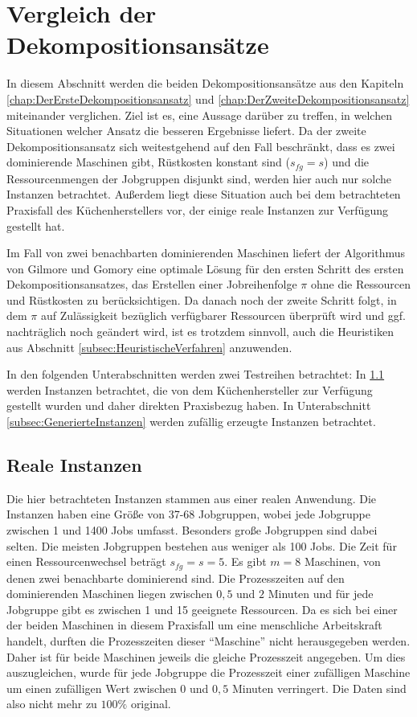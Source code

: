 \documentclass{scrreprt}
\begin{document}
\section{Vergleich der Dekompositionsansätze}
\label{sec:VergleichDerDekompositionsansaetze} 
In diesem Abschnitt werden die beiden Dekompositionsansätze aus den Kapiteln \ref{chap:DerErsteDekompositionsansatz} und \ref{chap:DerZweiteDekompositionsansatz}
miteinander verglichen. Ziel ist es, eine Aussage darüber zu treffen, in welchen Situationen welcher Ansatz die besseren Ergebnisse liefert.
Da der zweite Dekompositionsansatz sich weitestgehend auf den Fall beschränkt, dass es zwei dominierende Maschinen gibt,
Rüstkosten konstant sind ($s_{fg}=s$) und die Ressourcenmengen der Jobgruppen disjunkt sind, werden hier auch nur solche Instanzen betrachtet.
Außerdem liegt diese Situation auch bei dem betrachteten Praxisfall des Küchenherstellers vor, der einige reale Instanzen zur Verfügung gestellt hat.

Im Fall von zwei benachbarten dominierenden Maschinen liefert der Algorithmus von Gilmore und Gomory eine optimale Lösung für den ersten Schritt des ersten
Dekompositionsansatzes, das Erstellen einer Jobreihenfolge $\pi$ ohne die Ressourcen und Rüstkosten zu berücksichtigen.
Da danach noch der zweite Schritt folgt, in dem $\pi$ auf Zulässigkeit bezüglich verfügbarer Ressourcen überprüft wird
und ggf. nachträglich noch geändert wird, ist es trotzdem sinnvoll, auch die Heuristiken aus Abschnitt \ref{subsec:HeuristischeVerfahren} anzuwenden.

In den folgenden Unterabschnitten werden zwei Testreihen betrachtet: In \ref{subsec:RealeInstanzen} werden Instanzen betrachtet, 
die von dem Küchenhersteller zur Verfügung gestellt wurden und daher direkten Praxisbezug haben.
In Unterabschnitt \ref{subsec:GenerierteInstanzen} werden zufällig erzeugte Instanzen betrachtet.

\subsection{Reale Instanzen}
\label{subsec:RealeInstanzen}
Die hier betrachteten Instanzen stammen aus einer realen Anwendung.
Die Instanzen haben eine Größe von 37-68 Jobgruppen, wobei jede Jobgruppe zwischen 1 und 1400 Jobs umfasst. Besonders große Jobgruppen sind dabei selten.
Die meisten Jobgruppen bestehen aus weniger als 100 Jobs.
Die Zeit für einen Ressourcenwechsel beträgt $s_{fg}=s=5$.
Es gibt $m=8$ Maschinen, von denen zwei benachbarte dominierend sind.
Die Prozesszeiten auf den dominierenden Maschinen liegen zwischen $0{,}5$ und $2$ Minuten und für jede Jobgruppe gibt es zwischen 1 und 15 geeignete Ressourcen.
Da es sich bei einer der beiden Maschinen in diesem Praxisfall um eine menschliche Arbeitskraft handelt, 
durften die Prozesszeiten dieser "`Maschine"' nicht herausgegeben werden.
Daher ist für beide Maschinen jeweils die gleiche Prozesszeit angegeben.
Um dies auszugleichen, wurde für jede Jobgruppe die Prozesszeit einer zufälligen Maschine um einen zufälligen Wert zwischen $0$ und $0{,}5$ Minuten verringert.
Die Daten sind also nicht mehr zu $100\%$ original.
\end{document}

